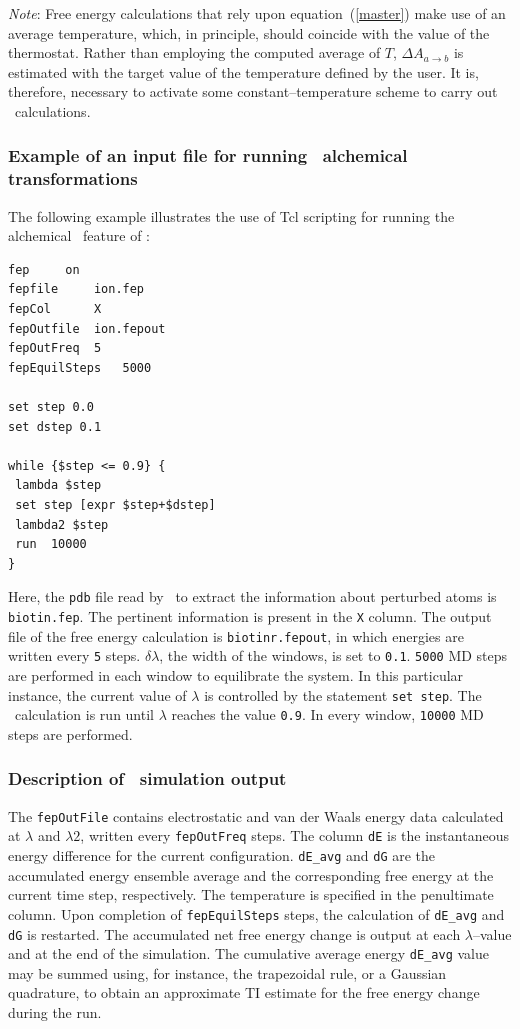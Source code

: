 \noindent
{\it Note}: Free energy calculations that rely upon equation~({\ref{master}})
make use of an average temperature, which, in principle, should coincide with
the value of the thermostat. Rather than employing the computed average of $T$,
$\Delta A_{a \rightarrow b}$ is estimated with the target value of the
temperature defined by the user. It is, therefore, necessary to activate
some constant--temperature scheme to carry out \FEP\ calculations. 



\subsubsection{Example of an input file for running \FEP\ alchemical transformations}


The following example illustrates the use of {\sc Tcl} scripting for running
the alchemical \FEP\ feature of \NAMD: 

\begin{verbatim}
fep		on  
fepfile		ion.fep
fepCol		X
fepOutfile	ion.fepout
fepOutFreq	5
fepEquilSteps	5000

set step 0.0
set dstep 0.1

while {$step <= 0.9} {
 lambda $step
 set step [expr $step+$dstep]
 lambda2 $step
 run  10000
}
\end{verbatim}

\noindent
Here, the {\tt pdb} file read by \NAMD\ to extract the information
about perturbed atoms is {\tt biotin.fep}. The pertinent information 
is present in the {\tt X} column. The output file of the free energy
calculation is {\tt biotinr.fepout}, in which energies are written
every {\tt 5} steps.
$\delta \lambda$, the width of the windows, is set to {\tt 0.1}.
{\tt 5000} MD steps are performed in each window to
equilibrate the system. In this particular instance, 
the current value of $\lambda$
is controlled by the statement {\tt set step}. 
The \FEP\ calculation is run until $\lambda$ reaches the
value {\tt 0.9}. In every window, {\tt 10000} MD steps
are performed.


\subsubsection{Description of \FEP\ simulation output }

The {\tt fepOutFile} contains electrostatic and van der Waals energy
data calculated at $\lambda$ and $\lambda2$, written every
{\tt fepOutFreq} steps. The column {\tt dE} is the instantaneous energy
difference for the current configuration. {\tt dE\_avg} and {\tt dG}
are the accumulated energy ensemble average and the corresponding
free energy at the current time step, respectively.
The temperature is specified in the penultimate column. Upon completion
of {\tt fepEquilSteps} steps, the calculation of {\tt dE\_avg} and 
{\tt dG} is restarted. The accumulated net free energy change is output
at each $\lambda$--value and at the end of the simulation. The cumulative
average energy {\tt dE\_avg} value may be summed using, for instance, the 
trapezoidal rule, or a Gaussian quadrature, to obtain an approximate 
TI estimate for the free energy change during the run.


